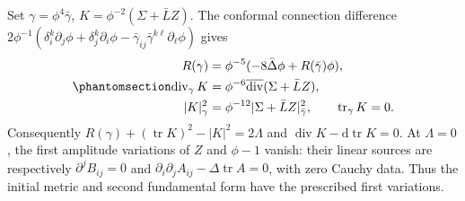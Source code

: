 \documentclass[
  english,
  11pt,
  reqno]{amsart}
\begin{document}
Set \(\gamma=\phi^4\bar\gamma\), \(K=\phi^{-2}(\Sigma+\bar LZ)\). The
conformal connection difference \(2\phi^{-1}(\delta_i^k\partial_j\phi+
\delta_j^k\partial_i\phi-\bar\gamma_{ij}\bar\gamma^{k\ell}\partial_\ell\phi)\)
gives
\begin{equation}\protect\phantomsection\label{eq:gg-finite-constraint-transform}{
 \begin{aligned}
 R(\gamma)&=\phi^{-5}(-8\bar\Delta\phi+R(\bar\gamma)\phi),\\
 \operatorname{div}_\gamma K
       &=\phi^{-6}\overline{\operatorname{div}}(\Sigma+\bar LZ),\\
 |K|_\gamma^2&=\phi^{-12}|\Sigma+\bar LZ|_{\bar\gamma}^2,\qquad
 \operatorname{tr}_\gamma K=0 .
 \end{aligned}
}\end{equation} Consequently
\(R(\gamma)+(\operatorname{tr}K)^2-|K|^2=2\Lambda\) and
\(\operatorname{div}K-\mathrm d\operatorname{tr}K=0\). At \(\Lambda=0\),
the first amplitude variations of \(Z\) and \(\phi-1\) vanish: their
linear sources are respectively \(\partial^jB_{ij}=0\) and
\(\partial_i\partial_jA_{ij}-\Delta\operatorname{tr}A=0\), with zero
Cauchy data. Thus the initial metric and second fundamental form have
the prescribed first variations.
\end{document}
